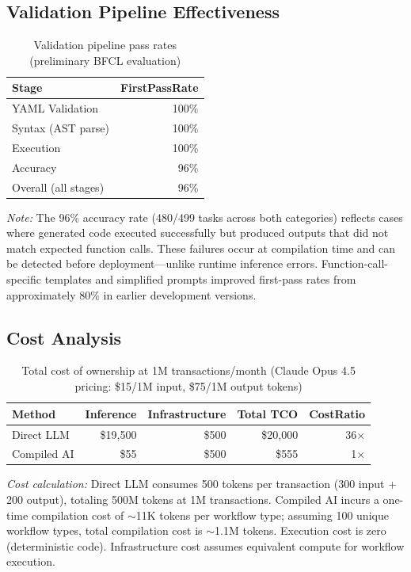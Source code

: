 \documentclass[11pt]{article}
\begin{document}
\subsection{Validation Pipeline Effectiveness}

\begin{table}[ht]
\centering
\caption{Validation pipeline pass rates (preliminary BFCL evaluation)}
\label{tab:validation-results}
\begin{tabular}{lr}
\toprule
Stage & FirstPassRate \\
\midrule
YAML Validation & 100\% \\
Syntax (AST parse) & 100\% \\
Execution & 100\% \\
Accuracy & 96\% \\
\midrule
Overall (all stages) & 96\% \\
\bottomrule
\end{tabular}
\end{table}

\noindent\textit{Note:} The 96\% accuracy rate (480/499 tasks across both categories) reflects cases where generated code executed successfully but produced outputs that did not match expected function calls. These failures occur at compilation time and can be detected before deployment---unlike runtime inference errors. Function-call-specific templates and simplified prompts improved first-pass rates from approximately 80\% in earlier development versions.

\subsection{Cost Analysis}

\begin{table}[ht]
\centering
\caption{Total cost of ownership at 1M transactions/month (Claude Opus 4.5 pricing: \$15/1M input, \$75/1M output tokens)}
\label{tab:cost-results}
\begin{tabular}{lrrrr}
\toprule
Method & Inference & Infrastructure & Total TCO & CostRatio \\
\midrule
Direct LLM & \$19,500 & \$500 & \$20,000 & 36$\times$ \\
Compiled AI & \$55 & \$500 & \$555 & 1$\times$ \\
\bottomrule
\end{tabular}
\end{table}

\noindent\textit{Cost calculation:} Direct LLM consumes 500 tokens per transaction (300 input + 200 output), totaling 500M tokens at 1M transactions. Compiled AI incurs a one-time compilation cost of $\sim$11K tokens per workflow type; assuming 100 unique workflow types, total compilation cost is $\sim$1.1M tokens. Execution cost is zero (deterministic code). Infrastructure cost assumes equivalent compute for workflow execution.
\end{document}
